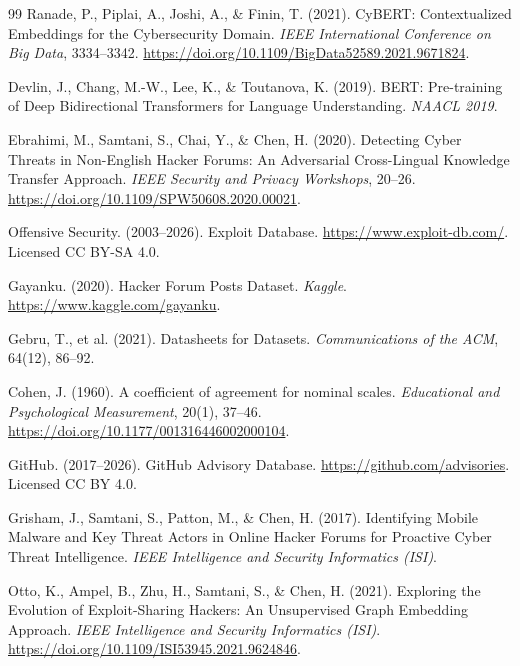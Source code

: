 \documentclass{article}
\begin{document}
\begin{thebibliography}{99}
Ranade, P., Piplai, A., Joshi, A., \& Finin, T. (2021).
CyBERT: Contextualized Embeddings for the Cybersecurity Domain.
\textit{IEEE International Conference on Big Data}, 3334--3342.
\url{https://doi.org/10.1109/BigData52589.2021.9671824}.

Devlin, J., Chang, M.-W., Lee, K., \& Toutanova, K.
(2019). BERT: Pre-training of Deep Bidirectional Transformers for
Language Understanding. \textit{NAACL 2019}.

Ebrahimi, M., Samtani, S., Chai, Y., \& Chen, H. (2020).
Detecting Cyber Threats in Non-English Hacker Forums: An Adversarial
Cross-Lingual Knowledge Transfer Approach.
\textit{IEEE Security and Privacy Workshops}, 20--26.
\url{https://doi.org/10.1109/SPW50608.2020.00021}.

Offensive Security. (2003--2026). Exploit Database.
\url{https://www.exploit-db.com/}. Licensed CC BY-SA 4.0.

Gayanku. (2020). Hacker Forum Posts Dataset.
\textit{Kaggle}. \url{https://www.kaggle.com/gayanku}.

Gebru, T., et al. (2021). Datasheets for Datasets.
\textit{Communications of the ACM}, 64(12), 86--92.

Cohen, J. (1960). A coefficient of agreement for nominal scales.
\textit{Educational and Psychological Measurement}, 20(1), 37--46.
\url{https://doi.org/10.1177/001316446002000104}.

GitHub. (2017--2026). GitHub Advisory Database.
\url{https://github.com/advisories}. Licensed CC BY 4.0.

Grisham, J., Samtani, S., Patton, M., \& Chen, H. (2017).
Identifying Mobile Malware and Key Threat Actors in Online Hacker Forums
for Proactive Cyber Threat Intelligence.
\textit{IEEE Intelligence and Security Informatics (ISI)}.

Otto, K., Ampel, B., Zhu, H., Samtani, S., \& Chen, H. (2021).
Exploring the Evolution of Exploit-Sharing Hackers: An Unsupervised
Graph Embedding Approach. \textit{IEEE Intelligence and Security
Informatics (ISI)}. \url{https://doi.org/10.1109/ISI53945.2021.9624846}.


\end{thebibliography}
\end{document}
